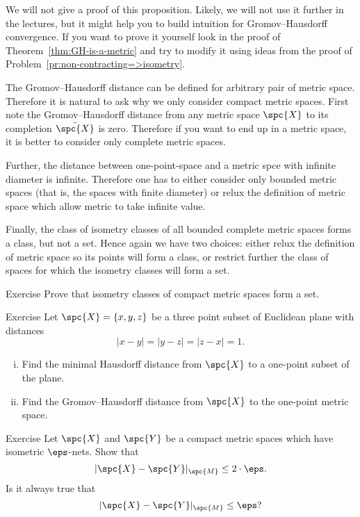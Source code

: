 We will not give a proof of this proposition. 
Likely, we will not use it further in the lectures, 
but it might help you to build intuition for Gromov--Hausdorff convergence.
If you want to prove it yourself look in the proof of Theorem~\ref{thm:GH-is-a-metric} 
and try to modify it using ideas from the proof of Problem~\ref{pr:non-contracting=>isometry}.

The Gromov--Hausdorff distance can be defined for arbitrary pair of metric space.
Therefore it is natural to ask why we only consider compact metric spaces.
First note the Gromov--Hausdorff distance from any metric space $\spc{X}$ 
to its completion $\bar {\spc{X}}$ is zero.
Therefore if you want to end up in a metric space, it is better to consider only complete metric spaces.

Further, the distance between one-point-space and a metric spce with infinite diameter is infinite.
Therefore one has to either consider only bounded metric spaces (that is, the spaces with finite diameter)
or relux the definition of metric space which allow metric to take infinite value.

Finally, the class of isometry classes of all bounded complete metric spaces forms a class, but not a set.
Hence again we have two choices: either relux the definition of metric space so its points will form a class, or restrict further the class of spaces for which the isometry classes will form a set.

\begin{thm}{Exercise}
Prove that isometry classes of compact metric spaces form a set. 
\end{thm}

\begin{thm}{Exercise}\label{pr:GH1}
Let $\spc{X}=\{x,y,z\}$ be a three point subset of Euclidean plane with distances
$$|x-y|=|y-z|=|z-x|=1.$$
\begin{enumerate}[(i)]
\item Find the minimal Hausdorff distance from $\spc{X}$ to a one-point subset of the plane.
\item Find the Gromov--Hausdorff distance from $\spc{X}$ to the one-point metric space. 
\end{enumerate}
\end{thm}

\begin{thm}{Exercise}\label{pr:GH2}
Let $\spc{X}$ and $\spc{Y}$ be a compact metric spaces which have isometric $\eps$-nets.
Show that 
$$|\spc{X}-\spc{Y}|_{\spc{M}}\le 2\cdot\eps.$$
Is it always true that 
$$|\spc{X}-\spc{Y}|_{\spc{M}}\le \eps?$$
\end{thm}




